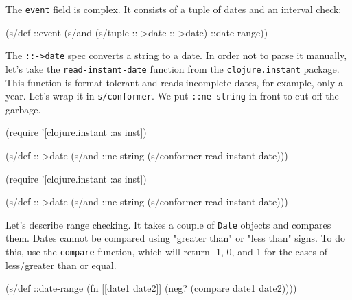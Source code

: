 The \verb|event| field is complex. It consists of a tuple of dates and an interval check:

\begin{english}
  \begin{clojure}
(s/def ::event
  (s/and (s/tuple ::->date ::->date)
         ::date-range))
  \end{clojure}
\end{english}


\mnoindent
The \verb|::->date| spec converts a string to a date. In order not to parse it manually, let's take the \verb|read-instant-date| function from the \verb|clojure.instant| package. This function is format-tolerant and reads incomplete dates, for example, only a year. Let's wrap it in \verb|s/conformer|. We put \verb|::ne-string| in front to cut off the garbage.


\ifx\DEVICETYPE\MOBILE

\begin{english}
  \begin{clojure}
(require '[clojure.instant :as inst])

(s/def ::->date
  (s/and ::ne-string
    (s/conformer read-instant-date)))
  \end{clojure}
\end{english}

\else

\begin{english}
  \begin{clojure}
(require '[clojure.instant :as inst])

(s/def ::->date
  (s/and ::ne-string (s/conformer read-instant-date)))
  \end{clojure}
\end{english}

\fi


Let's describe range checking. It takes a couple of \verb|Date| objects and compares them. Dates cannot be compared using "greater than" or "less than" signs. To do this, use the \verb|compare| function, which will return -1, 0, and 1 for the cases of less/greater than or equal.

\begin{english}
  \begin{clojure}
(s/def ::date-range
  (fn [[date1 date2]]
    (neg? (compare date1 date2))))
  \end{clojure}
\end{english}

